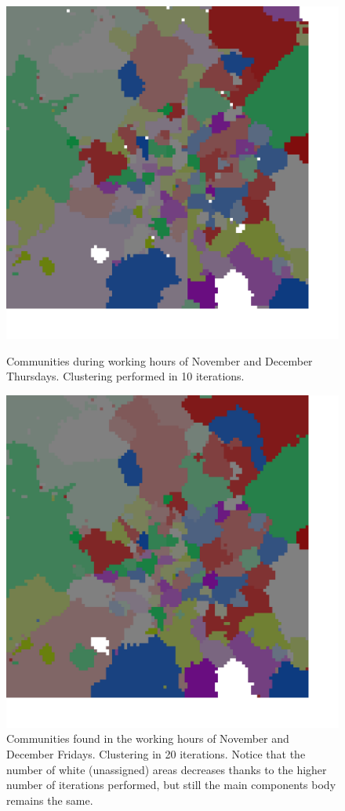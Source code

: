 \documentclass[12pt,a4paper]{article}
\begin{document}
\begin{figure}[H]
\includegraphics[width=\linewidth]{week/4Thu.png}
\label{fig:thursdayworking}
\caption{Communities during working hours of November and December Thursdays. Clustering performed in 10 iterations.}
\end{figure}

\begin{figure}[H]
\includegraphics[width=\linewidth]{week/5Fri.png}
\caption{Communities found in the working hours of November and December Fridays. Clustering in 20 iterations. Notice that the number of white (unassigned) areas decreases thanks to the higher number of iterations performed, but still the main components body remains the same.}
\label{fig:fridayworking}
\end{figure}
\end{document}
